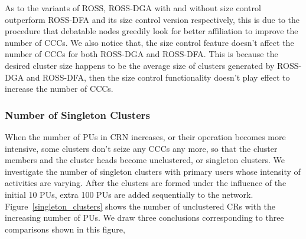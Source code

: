 \documentclass[10pt,journal,compsoc]{IEEEtran}
\theoremstyle{mytheoremstyle}
\theoremstyle{mytheoremstyle}
\theoremstyle{mytheoremstyle}
\newcommand{\ie}{i.e., }
\begin{document}
As to the variants of ROSS, ROSS-DGA with and without size control outperform ROSS-DFA and its size control version respectively, this is due to the procedure that debatable nodes greedily look for better affiliation to improve the number of CCCs.
We also notice that, the size control feature doesn't affect the number of CCCs for both ROSS-DGA and ROSS-DFA.
This is because the desired cluster size happens to be the average size of clusters generated by ROSS-DGA and ROSS-DFA, then the size control functionality doesn't play effect to increase the number of CCCs.



\subsubsection{Number of Singleton Clusters}
When the number of PUs in CRN increases, or their operation becomes more intensive, some clusters don't seize any CCCs any more, so that the cluster members and the cluster heads become unclustered, or singleton clusters.
We investigate the number of singleton clusters with primary users whose intensity of activities are varying.
After the clusters are formed under the influence of the initial 10 PUs, extra 100 PUs are added sequentially to the network.
Figure~\ref{singleton_clusters} shows the number of unclustered CRs with the increasing number of PUs.%
%
We draw three conclusions corresponding to three comparisons shown in this figure,
\end{document}
